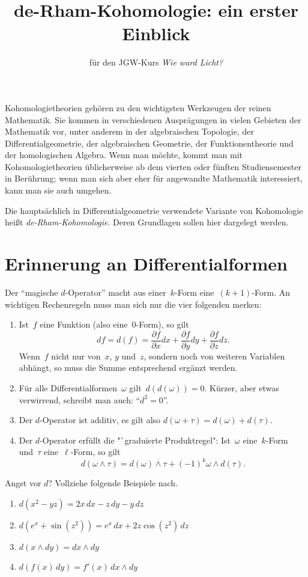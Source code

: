 \documentclass[twoside]{zirkelblatt1415}
\title{de-Rham-Kohomologie: ein erster Einblick}
\author{für den JGW-Kurs \emph{Wie ward Licht?}}
\theoremstyle{definition}
\theoremstyle{plain}
\theoremstyle{remark}
\begin{document}
\maketitle

Kohomologietheorien gehören zu den wichtigsten Werkzeugen der reinen
Mathematik. Sie kommen in verschiedenen Ausprägungen in vielen Gebieten der
Mathematik vor, unter anderem in der algebraischen Topologie, der
Differentialgeometrie, der algebraischen Geometrie, der Funktionentheorie und
der homologischen Algebra. Wenn man möchte, kommt man mit Kohomologietheorien
üblicherweise ab dem vierten oder fünften Studiensemester in Berührung; wenn
man sich aber eher für angewandte Mathematik interessiert, kann man sie auch
umgehen.

Die hauptsächlich in Differentialgeometrie verwendete Variante von Kohomologie
heißt \emph{de-Rham-Kohomologie}. Deren Grundlagen sollen hier dargelegt
werden.


\section{Erinnerung an Differentialformen}

Der "`magische $d$-Operator"' macht aus einer~$k$-Form eine~$(k+1)$-Form. An
wichtigen Rechenregeln muss man sich nur die vier folgenden merken:

\begin{enumerate}
\item Ist~$f$ eine Funktion (also eine~$0$-Form), so gilt
\[ df = d(f) = \frac{\partial f}{\partial x} dx +
  \frac{\partial f}{\partial y} dy +
  \frac{\partial f}{\partial z} dz. \]
Wenn~$f$ nicht nur von~$x$, $y$ und~$z$, sondern noch von weiteren Variablen
abhängt, so muss die Summe entsprechend ergänzt werden.
\item Für alle Differentialformen~$\omega$ gilt~$d(d(\omega)) = 0$. Kürzer,
aber etwas verwirrend, schreibt man auch: "`$d^2 = 0$"'.
\item Der $d$-Operator ist additiv, es gilt also $d(\omega + \tau) = d(\omega)
+ d(\tau)$.
\item Der $d$-Operator erfüllt die "`graduierte Produktregel": Ist~$\omega$
eine~$k$-Form und~$\tau$ eine~$\ell$-Form, so gilt
\[ d(\omega \wedge \tau) = d(\omega) \wedge \tau +
  (-1)^k \omega \wedge d(\tau). \]
\end{enumerate}

\begin{aufgabe}{Angst vor $d$?}
Vollziehe folgende Beispiele nach.
\begin{enumerate}
\item $d(x^2 - yz) = 2x\,dx - z\,dy - y\,dz$
\item $d(e^x + \sin(z^2)) = e^x\,dx + 2z\cos(z^2)\,dz$
\item $d(x \wedge dy) = dx \wedge dy$
\item $d(f(x)\,dy) = f'(x)\,dx\wedge dy$
\end{enumerate}
\end{aufgabe}
\end{document}
